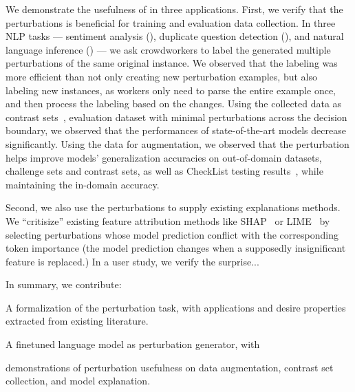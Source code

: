 We demonstrate the usefulness of \sysname in three applications. 
First, we verify that the perturbations is beneficial for training and evaluation data collection. 
In three NLP tasks --- sentiment analysis (\sst), duplicate question detection (\qqp), and natural language inference (\nli) --- we ask crowdworkers to label the generated multiple perturbations of the same original instance.
We observed that the labeling was more efficient than not only creating new perturbation examples, but also labeling new instances, as workers only need to parse the entire example once, and then process the labeling based on the changes.
Using the collected data as contrast sets~\cite{}, \ie evaluation dataset with minimal perturbations across the decision boundary, we observed that the performances of state-of-the-art models decrease significantly. 
Using the data for augmentation, we observed that the perturbation helps improve models' generalization accuracies on out-of-domain datasets, challenge sets and contrast sets, as well as CheckList testing results~\cite{checklist:acl20}, while maintaining the in-domain accuracy.

Second, we also use the perturbations to supply existing explanations methods.
We ``critisize'' existing feature attribution methods like SHAP~\cite{} or LIME~\cite{} by selecting perturbations whose model prediction conflict with the corresponding token importance (\eg the model prediction changes when a supposedly insignificant feature is replaced.)
In a user study, we verify the surprise...

In summary, we contribute: 
\begin{compactenum}
\item A formalization of the perturbation task, with applications and desire properties extracted from existing literature.
\item A finetuned language model as perturbation generator, with 
\item demonstrations of perturbation usefulness on data augmentation, contrast set collection, and model explanation. 
\end{compactenum}







